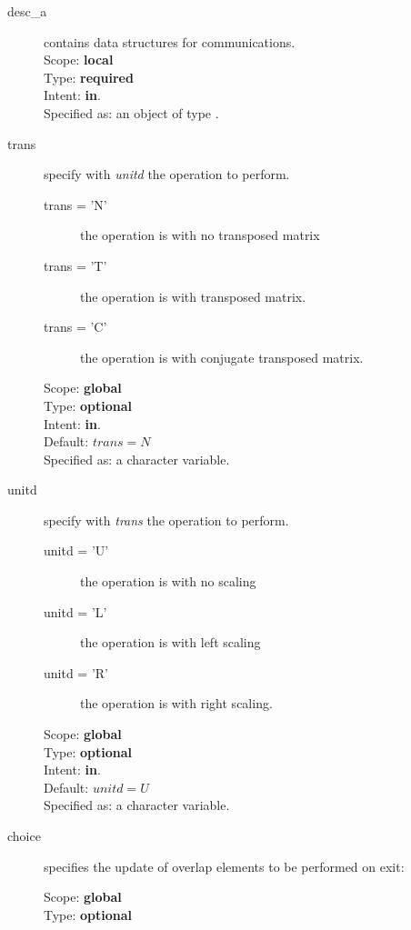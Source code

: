 \begin{description}
\item[desc\_a] contains data structures for communications.\\
Scope: {\bf local} \\
Type: {\bf required}\\
Intent: {\bf in}.\\
Specified as: an object of type \descdata.
\item[trans] specify with {\em unitd} the operation to perform.
\begin{description}
\item[trans = 'N'] the operation is with no transposed matrix
\item[trans = 'T'] the operation is with transposed matrix.
\item[trans = 'C'] the operation is with conjugate transposed matrix.
\end{description}
Scope: {\bf global} \\
Type: {\bf optional}\\	
Intent: {\bf in}.\\
Default: $trans = N$\\	
Specified as: a character variable.
\item[unitd] specify with {\em trans} the operation to perform.
\begin{description}
\item[unitd = 'U'] the operation is with no scaling
\item[unitd = 'L'] the operation is with left scaling
\item[unitd = 'R'] the operation is with right scaling.
\end{description}
Scope: {\bf global} \\
Type: {\bf optional}\\	
Intent: {\bf in}.\\
Default: $unitd = U$\\	
Specified as: a character variable.
\item[choice] specifies the update of overlap elements to be performed
  on exit:
Scope: {\bf global} \\
Type: {\bf optional}\\	

\end{description}
